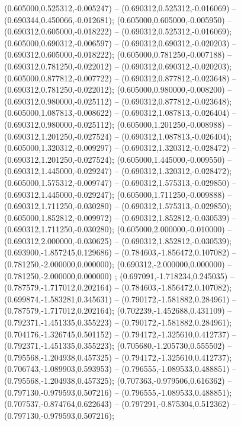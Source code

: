  (0.605000,0.525312,-0.005247) -- (0.690312,0.525312,-0.016069) -- (0.690344,0.450066,-0.012681);
 (0.605000,0.605000,-0.005950) -- (0.690312,0.605000,-0.018222) -- (0.690312,0.525312,-0.016069);
 (0.605000,0.690312,-0.006597) -- (0.690312,0.690312,-0.020203) -- (0.690312,0.605000,-0.018222);
 (0.605000,0.781250,-0.007188) -- (0.690312,0.781250,-0.022012) -- (0.690312,0.690312,-0.020203);
 (0.605000,0.877812,-0.007722) -- (0.690312,0.877812,-0.023648) -- (0.690312,0.781250,-0.022012);
 (0.605000,0.980000,-0.008200) -- (0.690312,0.980000,-0.025112) -- (0.690312,0.877812,-0.023648);
 (0.605000,1.087813,-0.008622) -- (0.690312,1.087813,-0.026404) -- (0.690312,0.980000,-0.025112);
 (0.605000,1.201250,-0.008988) -- (0.690312,1.201250,-0.027524) -- (0.690312,1.087813,-0.026404);
 (0.605000,1.320312,-0.009297) -- (0.690312,1.320312,-0.028472) -- (0.690312,1.201250,-0.027524);
 (0.605000,1.445000,-0.009550) -- (0.690312,1.445000,-0.029247) -- (0.690312,1.320312,-0.028472);
 (0.605000,1.575312,-0.009747) -- (0.690312,1.575313,-0.029850) -- (0.690312,1.445000,-0.029247);
 (0.605000,1.711250,-0.009888) -- (0.690312,1.711250,-0.030280) -- (0.690312,1.575313,-0.029850);
 (0.605000,1.852812,-0.009972) -- (0.690312,1.852812,-0.030539) -- (0.690312,1.711250,-0.030280);
 (0.605000,2.000000,-0.010000) -- (0.690312,2.000000,-0.030625) -- (0.690312,1.852812,-0.030539);
 (0.693900,-1.857245,0.129686) -- (0.784603,-1.856472,0.107082) -- (0.781250,-2.000000,0.000000);
 (0.690312,-2.000000,0.000000) -- (0.781250,-2.000000,0.000000) ;
 (0.697091,-1.718234,0.245035) -- (0.787579,-1.717012,0.202164) -- (0.784603,-1.856472,0.107082);
 (0.699874,-1.583281,0.345631) -- (0.790172,-1.581882,0.284961) -- (0.787579,-1.717012,0.202164);
 (0.702239,-1.452688,0.431109) -- (0.792371,-1.451335,0.355223) -- (0.790172,-1.581882,0.284961);
 (0.704176,-1.326745,0.501152) -- (0.794172,-1.325610,0.412737) -- (0.792371,-1.451335,0.355223);
 (0.705680,-1.205730,0.555502) -- (0.795568,-1.204938,0.457325) -- (0.794172,-1.325610,0.412737);
 (0.706743,-1.089903,0.593953) -- (0.796555,-1.089533,0.488851) -- (0.795568,-1.204938,0.457325);
 (0.707363,-0.979506,0.616362) -- (0.797130,-0.979593,0.507216) -- (0.796555,-1.089533,0.488851);
 (0.707537,-0.874764,0.622643) -- (0.797291,-0.875304,0.512362) -- (0.797130,-0.979593,0.507216);
